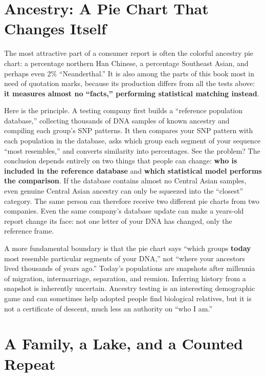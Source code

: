 \section{Ancestry: A Pie Chart That Changes Itself}

The most attractive part of a consumer report is often the colorful ancestry pie chart: a percentage northern Han Chinese, a percentage Southeast Asian, and perhaps even 2\% ``Neanderthal.'' It is also among the parts of this book most in need of quotation marks, because its production differs from all the tests above: \textbf{it measures almost no ``facts,'' performing statistical matching instead}.

Here is the principle. A testing company first builds a ``reference population database,'' collecting thousands of DNA samples of known ancestry and compiling each group's SNP patterns. It then compares your SNP pattern with each population in the database, asks which group each segment of your sequence ``most resembles,'' and converts similarity into percentages. See the problem? The conclusion depends entirely on two things that people can change: \textbf{who is included in the reference database} and \textbf{which statistical model performs the comparison}. If the database contains almost no Central Asian samples, even genuine Central Asian ancestry can only be squeezed into the ``closest'' category. The same person can therefore receive two different pie charts from two companies. Even the same company's database update can make a years-old report change its face: not one letter of your DNA has changed, only the reference frame.

A more fundamental boundary is that the pie chart says ``which groups \textbf{today} most resemble particular segments of your DNA,'' not ``where your ancestors lived thousands of years ago.'' Today's populations are snapshots after millennia of migration, intermarriage, separation, and reunion. Inferring history from a snapshot is inherently uncertain. Ancestry testing is an interesting demographic game and can sometimes help adopted people find biological relatives, but it is not a certificate of descent, much less an authority on ``who I am.''

\section{A Family, a Lake, and a Counted Repeat}

